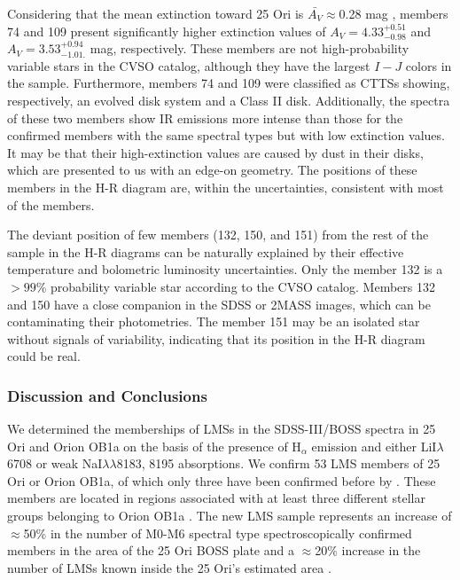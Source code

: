 \documentclass[12pt]{article}
\newcounter{subsubsubsection}[subsubsection]
\begin{document}
\label{sec_BOSS:high_extinction}

Considering that the mean extinction toward 25 Ori is $\bar{A_V}\approx$0.28 mag \citep{Kharchenko2005, Briceno2005, Briceno2007, Downes2014}, members 74 and 109 present significantly higher extinction values of $A_V=4.33^{+0.51}_{-0.98}$ and $A_V=3.53^{+0.94}_{-1.01.}$ mag, respectively. These members are not high-probability variable stars in the CVSO catalog, although they have the largest $I-J$ colors in the sample. Furthermore, members 74 and 109 were classified as CTTSs showing, respectively, an evolved disk system and a Class II disk. Additionally, the spectra of these two members show IR emissions more intense than those for the confirmed members with the same spectral types but with low extinction values. It may be that their high-extinction values are caused by dust in their disks, which are presented to us with an edge-on geometry. The positions of these members in the H-R diagram are, within the uncertainties, consistent with most of the members. 


The deviant position of few members (132, 150, and 151) from the rest of the sample in the H-R diagrams can be naturally explained by their effective temperature and bolometric luminosity uncertainties. Only the member 132 is a $>99\%$ probability variable star according to the CVSO catalog. Members 132 and 150 have a close companion in the SDSS or 2MASS images, which can be contaminating their photometries. The member 151 may be an isolated star without signals of variability, indicating that its position in the H-R diagram could be real.

\subsubsection{Discussion and Conclusions}
\label{sec_BOSS:summary}

We determined the memberships of LMSs in the SDSS-III/BOSS spectra in 25 Ori and Orion OB1a on the basis of the presence of H$_\alpha$ emission and either LiI$\lambda$6708 or weak NaI$\lambda\lambda$8183, 8195 absorptions. We confirm 53 LMS members of 25 Ori or Orion OB1a, of which only three have been confirmed before by \citet{Downes2014}. These members are located in regions associated with at least three different stellar groups belonging to Orion OB1a \citep[25 Ori, ASCC 18, and ASCC 20; ][]{Kharchenko2005,Kharchenko2013}. The new LMS sample represents an increase of $\approx$50\% in the number of M0-M6 spectral type spectroscopically confirmed members in the area of the 25 Ori BOSS plate and a $\approx$20\% increase in the number of LMSs known inside the 25 Ori's estimated area \citep[1$^\circ$ radius; ][]{Briceno2005,Briceno2007}.
\end{document}
